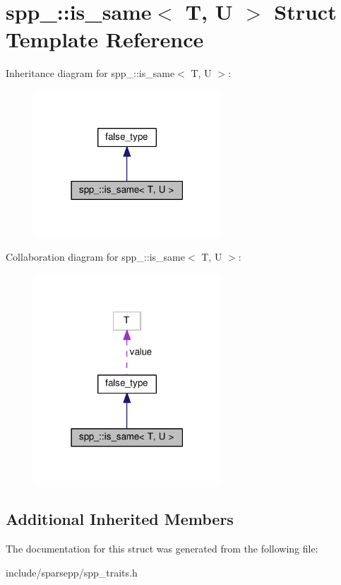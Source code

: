 \hypertarget{structspp___1_1is__same}{}\section{spp\+\_\+\+:\+:is\+\_\+same$<$ T, U $>$ Struct Template Reference}
\label{structspp___1_1is__same}


Inheritance diagram for spp\+\_\+\+:\+:is\+\_\+same$<$ T, U $>$\+:\nopagebreak
\begin{figure}[H]
\begin{center}
\leavevmode
\includegraphics[width=198pt]{structspp___1_1is__same__inherit__graph}
\end{center}
\end{figure}


Collaboration diagram for spp\+\_\+\+:\+:is\+\_\+same$<$ T, U $>$\+:\nopagebreak
\begin{figure}[H]
\begin{center}
\leavevmode
\includegraphics[width=198pt]{structspp___1_1is__same__coll__graph}
\end{center}
\end{figure}
\subsection*{Additional Inherited Members}


The documentation for this struct was generated from the following file\+:\begin{DoxyCompactItemize}
\item 
include/sparsepp/spp\+\_\+traits.\+h\end{DoxyCompactItemize}
